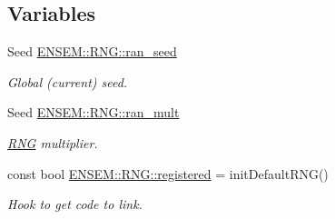 \subsection*{Variables}
\begin{DoxyCompactItemize}
\item 
Seed \mbox{\hyperlink{namespaceENSEM_1_1RNG_a3d617978a554c127dc164947d602b288}{E\+N\+S\+E\+M\+::\+R\+N\+G\+::ran\+\_\+seed}}
\begin{DoxyCompactList}\small\item\em Global (current) seed. \end{DoxyCompactList}\item 
Seed \mbox{\hyperlink{namespaceENSEM_1_1RNG_a934549765fb4b894a8dafd77fb0aa3d1}{E\+N\+S\+E\+M\+::\+R\+N\+G\+::ran\+\_\+mult}}
\begin{DoxyCompactList}\small\item\em \mbox{\hyperlink{namespaceENSEM_1_1RNG}{R\+NG}} multiplier. \end{DoxyCompactList}\item 
const bool \mbox{\hyperlink{namespaceENSEM_1_1RNG_ac792bd2933a030bd73c2ffd2d289cc53}{E\+N\+S\+E\+M\+::\+R\+N\+G\+::registered}} = init\+Default\+R\+NG()
\begin{DoxyCompactList}\small\item\em Hook to get code to link. \end{DoxyCompactList}\end{DoxyCompactItemize}
